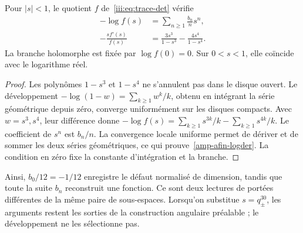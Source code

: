 \begin{theorem}
\label{amp-afin-thm-logdet}
Pour $|s|<1$, le quotient $f$ de~\eqref{iii:eq:trace-det} vérifie
\begin{align}
 -\log f(s)&=\sum_{n\geq1}\frac{b_n}{n}s^n,\label{amp-afin-logdet}\\
 -\frac{s f'(s)}{f(s)}
 &=\frac{3s^3}{1-s^3}-\frac{4s^4}{1-s^4}.
 \label{amp-afin-logder}
\end{align}
La branche holomorphe est fixée par $\log f(0)=0$.
Sur $0<s<1$, elle coïncide avec le logarithme réel.
\end{theorem}
\begin{proof}
Les polynômes $1-s^3$ et $1-s^4$ ne s’annulent pas dans le disque ouvert.
Le développement $-\log(1-w)=\sum_{k\geq1}w^k/k$, obtenu en intégrant
la série géométrique depuis zéro, converge uniformément sur les disques
compacts. Avec $w=s^3,s^4$, leur différence donne
$-\log f(s)=\sum_{k\geq1}s^{3k}/k-\sum_{k\geq1}s^{4k}/k$.
Le coefficient de $s^n$ est $b_n/n$.
La convergence locale uniforme permet de dériver et de sommer les deux séries
géométriques, ce qui prouve~\eqref{amp-afin-logder}.
La condition en zéro fixe la constante d’intégration et la branche.
\end{proof}

Ainsi, $b_0/12=-1/12$ enregistre le défaut normalisé de dimension,
tandis que toute la suite $b_n$ reconstruit une fonction.
Ce sont deux lectures de portées différentes de la même paire de sous-espaces.
Lorsqu’on substitue $s=q_\pm^{30}$, les arguments restent les sorties
de la construction angulaire préalable ; le développement ne les sélectionne pas.

